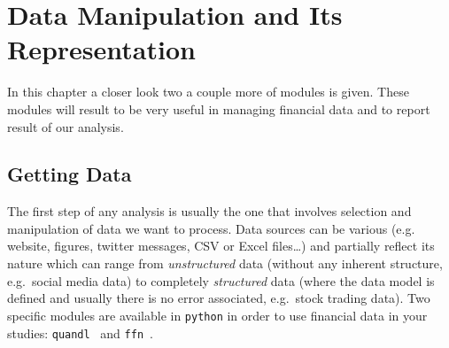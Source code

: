 \chapter{Data Manipulation and Its Representation}

In this chapter a closer look two a couple more of modules is given. These modules will result to be very useful in managing financial data and to report result of our analysis.

\section{Getting Data}\label{getting-data}

The first step of any analysis is usually the one that involves selection and manipulation of data we want to process. Data sources can be various (e.g. website, figures, twitter messages, CSV or Excel files\ldots{}) and partially reflect its nature which can range from \emph{unstructured} data (without any inherent structure, e.g.~social media data) to completely \emph{structured} data (where the data model is defined and usually there is no error associated, e.g.~stock trading data).
Two specific modules are available in \texttt{python} in order to use financial data in your studies: \texttt{quandl}~\cite{quandl} and \texttt{ffn}~\cite{ffn}.

